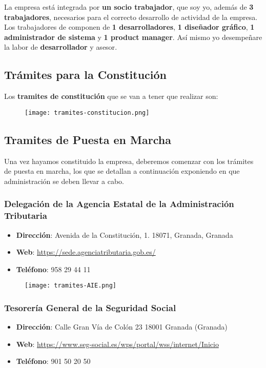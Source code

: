 La empresa está integrada por \textbf{un socio trabajador}, que soy yo, además de \textbf{3 trabajadores}, necesarios para el correcto desarrollo de actividad de la empresa. Los trabajadores de componen de \textbf{1 desarrolladores}, \textbf{1 diseñador gráfico}, \textbf{1 administrador de sistema} y \textbf{1 product manager}. Así mismo yo desempeñare la labor de \textbf{desarrollador} y {asesor}.

\subsection{Trámites para la Constitución}
Los\textbf{ tramites de constitución} que se van a tener que realizar son:
\begin{figure}[H]
    \centering
    \texttt{[image: tramites-constitucion.png]}
\end{figure}

\subsection{Tramites de Puesta en Marcha}
Una vez hayamos constituido la empresa, deberemos comenzar con los trámites de puesta en marcha, los que se detallan a continuación exponiendo en que administración se deben llevar a cabo.

\subsubsection*{Delegación de la Agencia Estatal de la Administración Tributaria}
\begin{itemize}
    \item \textbf{Dirección}: Avenida de la Constitución, 1. 18071, Granada, Granada
    \item \textbf{Web}: \url{https://sede.agenciatributaria.gob.es/}
    \item \textbf{Teléfono}: 958 29 44 11
\end{itemize}

\begin{figure}[H]
    \centering
    \texttt{[image: tramites-AIE.png]}
\end{figure}

\subsubsection*{Tesorería General de la Seguridad Social}
\begin{itemize}
    \item \textbf{Dirección}: Calle Gran Vía de Colón 23 18001 Granada (Granada)
    \item \textbf{Web}: \url{https://www.seg-social.es/wps/portal/wss/internet/Inicio}
    \item \textbf{Teléfono}: 901 50 20 50
\end{itemize}

